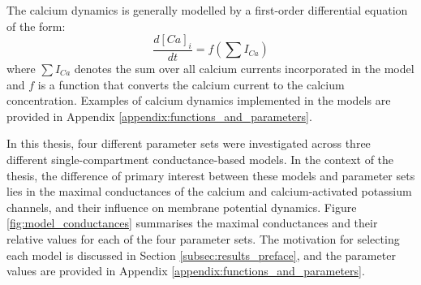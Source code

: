 \documentclass[../main.tex]{subfiles}
\begin{document}
The calcium dynamics is generally modelled by a first-order differential equation of the form:
\begin{equation}
    \frac{d[Ca]_i}{dt}=f(\sum I_{Ca})
\end{equation}
where $\sum I_{Ca}$ denotes the sum over all calcium currents incorporated in the model and $f$ is a function that converts the calcium current to the calcium concentration. Examples of calcium dynamics implemented in the models are provided in Appendix \ref{appendix:functions_and_parameters}.

In this thesis, four different parameter sets were investigated across three different single-compartment conductance-based models. 
In the context of the thesis, the difference of primary interest between these models and parameter sets lies in the maximal conductances of the calcium and calcium-activated potassium channels, and their influence on membrane potential dynamics.
Figure \ref{fig:model_conductances} summarises the maximal conductances and their relative values for each of the four parameter sets. The motivation for selecting each model is discussed in Section \ref{subsec:results_preface}, and the parameter values are provided in Appendix \ref{appendix:functions_and_parameters}.
\end{document}
